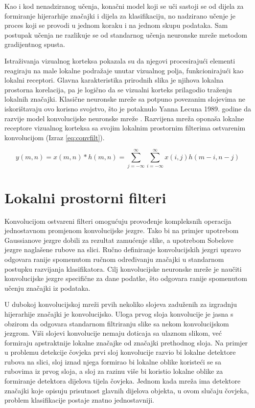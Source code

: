 \documentclass[lmodern, utf8, diplomski, numeric]{fer}
\begin{document}
Kao i kod nenadziranog učenja, konačni model koji se uči sastoji se od dijela za formiranje hijerarhije značajki i dijela za klasifikaciju, no nadzirano učenje je proces koji se provodi u jednom koraku i na jednom skupu podataka. Sam postupak učenja ne razlikuje se od standarnog učenja neuronske mreže metodom gradijentnog spusta.

Istraživanja vizualnog korteksa pokazala su da njegovi procesirajući elementi reagiraju na male lokalne podražaje unutar vizualnog polja, funkcionirajući kao lokalni receptori. Glavna karakteristika prirodnih slika je njihova lokalna prostorna korelacija, pa je logično da se vizualni korteks prilagodio traženju lokalnih značajki.
Klasične neuronske mreže sa potpuno povezanim slojevima ne iskorištavaju ovo korisno svojstvo, što je potaknulo Yanna Lecuna 1989. godine da razvije model konvolucijske neuronske mreže \cite{lecun1998lenet}. Razvijena mreža oponaša lokalne receptore vizualnog korteksa sa svojim lokalnim prostornim filterima ostvarenim konvolucijom (Izraz \ref{eq:convfilt}).

\begin{equation}
y(m,n) = x(m,n)  \ast h(m,n) = \sum\limits_{j=-\infty}^{\infty} \sum\limits_{i=-\infty}^{\infty} x(i,j) h(m-i,n-j)  
\label{eq:convfilt}
\end{equation}

\section{Lokalni prostorni filteri}

Konvolucijom ostvareni filteri omogućuju provođenje kompleksnih operacija jednostavnom promjenom konvolucijske jezgre. Tako bi na primjer upotrebom Gaussianove jezgre dobili za rezultat zamućenje slike, a upotrebom Sobelove jezgre \cite{sobel1968operator} naglašene rubove na slici. Ručno definiranje konvolucijskih jezgri upravo odgovara ranije spomenutom ručnom određivanju značajki u standarnom postupku razvijanja klasifikatora. Cilj konvolucijske neuronske mreže je naučiti konvolucijske jezgre specifične za dane podatke, što odgovara ranije spomenutom učenju značajki iz podataka.

U dubokoj konvolucijskoj mreži prvih nekoliko slojeva zaduženih za izgradnju hijerarhije značajki je konvolucijsko. Uloga prvog sloja konvolucije je jasna s obzirom da odgovara standarnom filtriranju slike sa nekom konvolucijskom jezgrom. Viši slojevi konvolucije nemaju doticaja sa ulaznom slikom, već formiraju apstraktnije lokalne značajke od značajki prethodnog sloja. Na primjer u problemu detekcije čovjeka prvi sloj konvolucije razvio bi lokalne detektore rubova na slici, sloj iznad njega formirao bi lokalne oblike koristeći se sa rubovima iz prvog sloja, a sloj za razinu više bi koristio lokalne oblike za formiranje detektora dijelova tijela čovjeka. Jednom kada mreža ima detektore značajki koje opisuju prisutnost glavnih dijelova objekta, u ovom slučaju čovjeka, problem klasifikacije postaje znatno jednostavniji.
\end{document}
